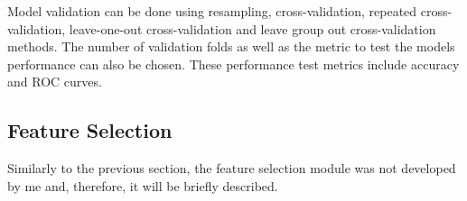 Model validation can be done using resampling, cross-validation, repeated cross-validation, leave-one-out cross-validation and leave group out cross-validation methods. The number of validation folds as well as the metric to test the models performance can also be chosen. These performance test metrics include accuracy and ROC curves.

%




\subsection{Feature Selection}

Similarly to the previous section, the feature selection module was not developed by me and, therefore, it will be briefly described.

